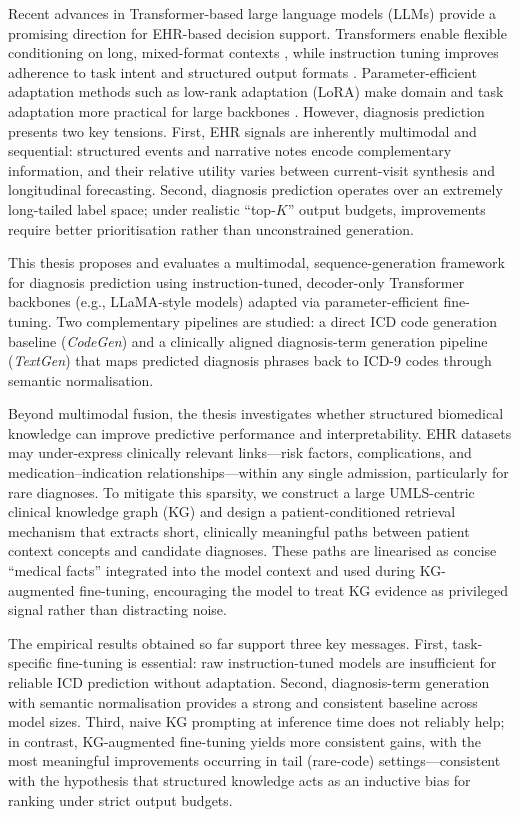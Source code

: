 Recent advances in Transformer-based large language models (LLMs) provide a promising direction for EHR-based decision support. Transformers enable flexible conditioning on long, mixed-format contexts \cite{vaswani2017attention}, while instruction tuning improves adherence to task intent and structured output formats \cite{ouyang2022training}. Parameter-efficient adaptation methods such as low-rank adaptation (LoRA) make domain and task adaptation more practical for large backbones \cite{hu2021lora}. However, diagnosis prediction presents two key tensions. First, EHR signals are inherently multimodal and sequential: structured events and narrative notes encode complementary information, and their relative utility varies between current-visit synthesis and longitudinal forecasting. Second, diagnosis prediction operates over an extremely long-tailed label space; under realistic ``top-$K$'' output budgets, improvements require better prioritisation rather than unconstrained generation.

This thesis proposes and evaluates a multimodal, sequence-generation framework for diagnosis prediction using instruction-tuned, decoder-only Transformer backbones (e.g., LLaMA-style models) \cite{touvron2023llama} adapted via parameter-efficient fine-tuning. Two complementary pipelines are studied: a direct ICD code generation baseline (\textit{CodeGen}) and a clinically aligned diagnosis-term generation pipeline (\textit{TextGen}) that maps predicted diagnosis phrases back to ICD-9 codes through semantic normalisation.

Beyond multimodal fusion, the thesis investigates whether structured biomedical knowledge can improve predictive performance and interpretability. EHR datasets may under-express clinically relevant links---risk factors, complications, and medication--indication relationships---within any single admission, particularly for rare diagnoses. To mitigate this sparsity, we construct a large UMLS-centric clinical knowledge graph (KG) \cite{bodenreider2004umls} and design a patient-conditioned retrieval mechanism that extracts short, clinically meaningful paths between patient context concepts and candidate diagnoses. These paths are linearised as concise ``medical facts'' integrated into the model context and used during KG-augmented fine-tuning, encouraging the model to treat KG evidence as privileged signal rather than distracting noise.

The empirical results obtained so far support three key messages. First, task-specific fine-tuning is essential: raw instruction-tuned models are insufficient for reliable ICD prediction without adaptation. Second, diagnosis-term generation with semantic normalisation provides a strong and consistent baseline across model sizes. Third, naive KG prompting at inference time does not reliably help; in contrast, KG-augmented fine-tuning yields more consistent gains, with the most meaningful improvements occurring in tail (rare-code) settings---consistent with the hypothesis that structured knowledge acts as an inductive bias for ranking under strict output budgets.

